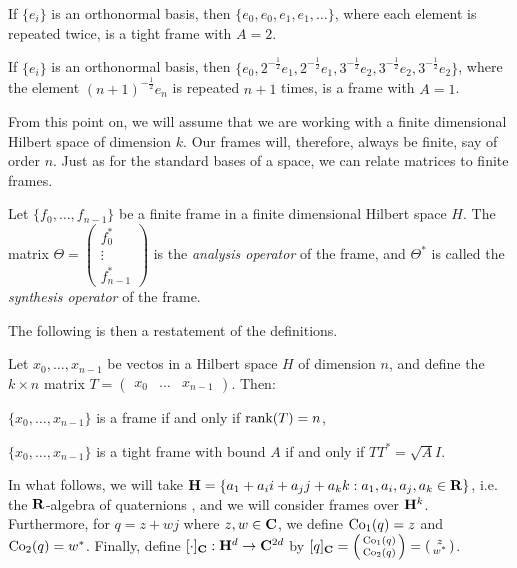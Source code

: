 \documentclass[../../../main]{subfiles}
\begin{document}
\begin{ex}
 If $\{e_i\}$ is an orthonormal basis, then $\{e_0,e_0,e_1,e_1,\dots\}$, where each element is repeated twice, is a tight frame with $A=2$.
\end{ex}

\begin{ex}
 If $\{e_i\}$ is an orthonormal basis, then $\{e_0,2^{-\frac{1}{2}}e_1,2^{-\frac{1}{2}}e_1,3^{-\frac{1}{2}}e_2,3^{-\frac{1}{2}}e_2,3^{-\frac{1}{2}}e_2\}$, where the element $(n+1)^{-\frac{1}{2}}e_n$ is repeated $n+1$ times, is a frame with $A=1$.
\end{ex}

From this point on, we will assume that we are working with a finite dimensional Hilbert space of dimension $k$. Our frames will, therefore, always be finite, say of order $n$. Just as for the standard bases of a space, we can relate matrices to finite frames.

\begin{defin}
 Let $\{f_0, \dots,f_{n-1}\}$ be a finite frame in a finite dimensional Hilbert space $H$. The matrix $\Theta=\left(\begin{smallmatrix} f_0^* \\ \vdots \\ f_{n-1}^* \end{smallmatrix}\right)$ is the {\it analysis operator} of the frame, and $\Theta^*$ is called the {\it synthesis operator} of the frame.
\end{defin}

The following is then a restatement of the definitions.

\begin{prop}
 Let $x_0,\dots,x_{n-1}$ be vectos in a Hilbert space $H$ of dimension $n$, and define the $k \times n$ matrix $T=\left(\begin{smallmatrix} x_0 & \dots & x_{n-1} \end{smallmatrix}\right)$. Then:
 \begin{defenum}
  \item $\{x_0,\dots,x_{n-1}\}$ is a frame if and only if $\text{rank}(T)=n$,
  \item $\{x_0,\dots,x_{n-1}\}$ is a tight frame with bound $A$ if and only if $TT^*=\sqrt{A}I$.
 \end{defenum}
\end{prop}

In what follows, we will take $\mathbf{H} = \{a_1 + a_ii + a_jj + a_kk :
a_1,a_i,a_j,a_k \in \mathbf{R}\}$, i.e. the $\mathbf{R}$-algebra of quaternions , and we will consider frames over $\mathbf{H}^k$. Furthermore, for $q=z+wj$ where $z,w \in \mathbf{C}$, we define $\text{Co}_1(q)=z$ and $\text{Co}_2(q)=w^*$. Finally, define $[\cdot]_{\mathbf{C}} : \mathbf{H}^d \rightarrow \mathbf{C}^{2d}$ by $[q]_{\mathbf{C}} = \left(\begin{smallmatrix} \text{Co}_1(q) \\ \text{Co}_2(q) \end{smallmatrix}\right) = \left(\begin{smallmatrix} z \\ w^* \end{smallmatrix}\right)$.
\end{document}
